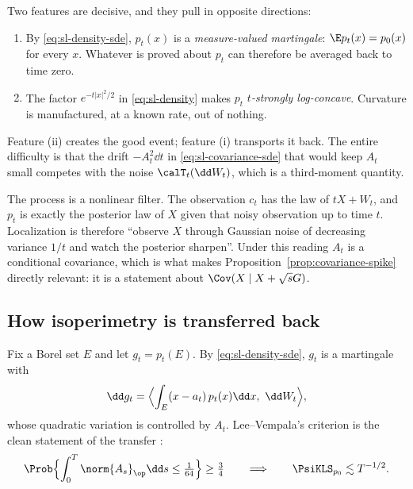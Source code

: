 \documentclass[../../main.tex]{subfiles}
\begin{document}
Two features are decisive, and they pull in opposite directions:

\begin{enumerate}[label=(\roman*),leftmargin=2.4em]
  \item By \eqref{eq:sl-density-sde}, $p_t(x)$ is a \emph{measure-valued martingale}:
  $\E p_t(x)=p_0(x)$ for every $x$. Whatever is proved about $p_t$ can therefore be averaged back
  to time zero.
  \item The factor $e^{-t|x|^2/2}$ in \eqref{eq:sl-density} makes $p_t$ \emph{$t$-strongly
  log-concave}. Curvature is manufactured, at a known rate, out of nothing.
\end{enumerate}

Feature (ii) creates the good event; feature (i) transports it back. The entire difficulty is that
the drift $-A_t^2\dd t$ in \eqref{eq:sl-covariance-sde} that would keep $A_t$ small competes with
the noise $\calT_t(\dd W_t)$, which is a third-moment quantity.

\begin{remark}
\label{rem:sl-filtering}
The process is a nonlinear filter. The observation $c_t$ has the law of $tX+W_t$, and $p_t$ is
exactly the posterior law of $X$ given that noisy observation up to time $t$. Localization is
therefore ``observe $X$ through Gaussian noise of decreasing variance $1/t$ and watch the
posterior sharpen''. Under this reading $A_t$ is a conditional covariance, which is what makes
Proposition~\ref{prop:covariance-spike} directly relevant: it is a statement about
$\Cov(X\mid X+\sqrt sG)$.
\end{remark}

\subsection{How isoperimetry is transferred back}
\label{subsec:sl-transfer}

Fix a Borel set $E$ and let $g_t=p_t(E)$. By \eqref{eq:sl-density-sde}, $g_t$ is a martingale with
\begin{equation}
  \dd g_t=\Bigl\langle\int_E(x-a_t)\,p_t(x)\dd x,\ \dd W_t\Bigr\rangle,
  \label{eq:mass-martingale-sde}
\end{equation}
whose quadratic variation is controlled by $A_t$. Lee--Vempala's criterion is the clean statement
of the transfer \cite{LeeVempala2018}:
\begin{equation}
  \Prob\Bigl\{\int_0^T\norm{A_s}_\op\dd s\le\tfrac1{64}\Bigr\}\ge\tfrac34
  \qquad\Longrightarrow\qquad
  \PsiKLS_{p_0}\lesssim T^{-1/2}.
  \label{eq:lv-criterion}
\end{equation}
\end{document}
